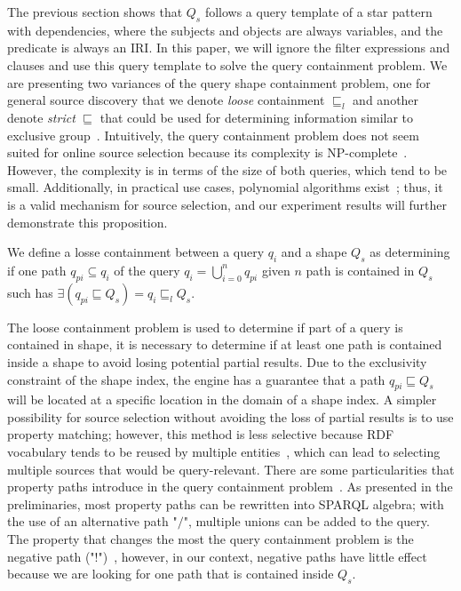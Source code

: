 \iffalse
The previous section shows that $Q_s$ follows a query template of a star pattern with dependencies, where the subjects and objects are always variables, and the predicate is always an IRI.
In this paper, we will ignore the filter expressions and clauses and use this query template to solve the query containment problem.
We are presenting two variances of the query shape containment problem, one for general source discovery that we denote \emph{loose} containment $\sqsubseteq_l$ and 
another denote \emph{strict} $\sqsubseteq$ that could be used for determining information similar to exclusive group~\cite{Schwarte2011}. 
Intuitively, the query containment problem does not seem suited for online source selection because its complexity is NP-complete~\cite{Spasi2023}.
However, the complexity is in terms of the size of both queries, which tend to be small.
Additionally, in practical use cases, polynomial algorithms exist~\cite{Doan2012}; 
thus, it is a valid mechanism for source selection, and our experiment results will further demonstrate this proposition.





\begin{definition}\label{def:looseContainment}
We define a losse containment between a query $q_i$ and a shape $Q_s$ as determining if one path $q_{pi} \subseteq q_i$ of the query $q_i = \bigcup_{i=0}^{n} q_{pi}$ given $n$ path is contained in 
$Q_s$ such has $\exists (q_{pi} \sqsubseteq  Q_s) = q_{i} \sqsubseteq_l  Q_s$.
\end{definition}

The loose containment problem is used to determine if part of a query is contained in shape,
it is necessary to determine if at least one path is contained inside a shape to avoid losing potential partial results.
Due to the exclusivity constraint of the shape index, the engine has a guarantee that a path $q_{pi} \sqsubseteq Q_s$ will be located at a specific location in the domain of a shape index.
A simpler possibility for source selection without avoiding the loss of partial results is to use property matching;
however, this method is less selective because RDF vocabulary tends to be reused by multiple entities~\cite{Stuckenschmidt2004, Harth2010},
which can lead to selecting multiple sources that would be query-relevant.
There are some particularities that property paths introduce in the query containment problem~\cite{Kostylev2015}.
As presented in the preliminaries, most property paths can be rewritten into SPARQL algebra; with the use of an alternative path "$/$", multiple unions can be added to the query.
The property that changes the most the query containment problem is the negative path ("$!$")~\cite{Kostylev2015},
however, in our context, negative paths have little effect because we are looking for one path that is contained inside $Q_s$.

